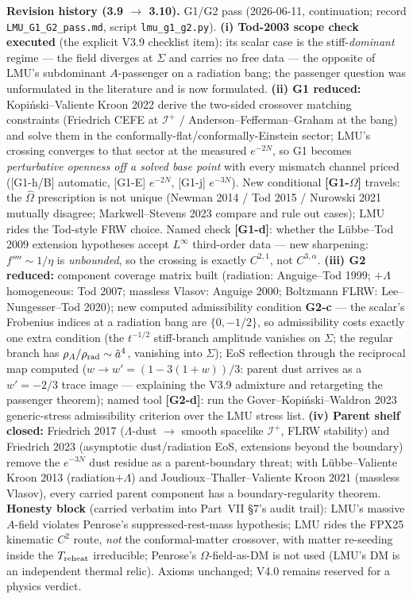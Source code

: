 \documentclass[11pt]{article}
\begin{document}
{\noindent\textbf{Revision history (3.9 $\to$ 3.10).} G1/G2 pass (2026-06-11, continuation; record \texttt{LMU\_G1\_G2\_pass.md}, script \texttt{lmu\_g1\_g2.py}). \textbf{(i) Tod-2003 scope check executed} (the explicit V3.9 checklist item): its scalar case is the stiff-\emph{dominant} regime --- the field diverges at $\Sigma$ and carries no free data --- the opposite of LMU's subdominant $A$-passenger on a radiation bang; the passenger question was unformulated in the literature and is now formulated. \textbf{(ii) G1 reduced:} Kopi\'nski--Valiente Kroon 2022 derive the two-sided crossover matching constraints (Friedrich CEFE at $\mathscr I^+$ / Anderson--Fefferman--Graham at the bang) and solve them in the conformally-flat/conformally-Einstein sector; LMU's crossing converges to that sector at the measured $e^{-2N}$, so G1 becomes \emph{perturbative openness off a solved base point} with every mismatch channel priced ([G1-h/B] automatic, [G1-E] $e^{-2N}$, [G1-j] $e^{-3N}$). New conditional \textbf{[G1-$\Omega$]} travels: the $\hat\Omega$ prescription is not unique (Newman 2014 / Tod 2015 / Nurowski 2021 mutually disagree; Markwell--Stevens 2023 compare and rule out cases); LMU rides the Tod-style FRW choice. Named check \textbf{[G1-d]}: whether the L\"ubbe--Tod 2009 extension hypotheses accept $L^\infty$ third-order data --- new sharpening: $f''''\sim1/\eta$ is \emph{unbounded}, so the crossing is exactly $C^{2,1}$, not $C^{3,\alpha}$. \textbf{(iii) G2 reduced:} component coverage matrix built (radiation: Anguige--Tod 1999; $+\Lambda$ homogeneous: Tod 2007; massless Vlasov: Anguige 2000; Boltzmann FLRW: Lee--Nungesser--Tod 2020); new computed admissibility condition \textbf{G2-c} --- the scalar's Frobenius indices at a radiation bang are $\{0,-1/2\}$, so admissibility costs exactly one extra condition (the $t^{-1/2}$ stiff-branch amplitude vanishes on $\Sigma$; the regular branch has $\rho_A/\rho_{\rm rad}\sim\hat a^4$, vanishing into $\Sigma$); EoS reflection through the reciprocal map computed ($w\to w'=(1-3(1+w))/3$: parent dust arrives as a $w'=-2/3$ trace image --- explaining the V3.9 admixture and retargeting the passenger theorem); named tool \textbf{[G2-d]}: run the Gover--Kopi\'nski--Waldron 2023 generic-stress admissibility criterion over the LMU stress list. \textbf{(iv) Parent shelf closed:} Friedrich 2017 ($\Lambda$-dust $\to$ smooth spacelike $\mathscr I^+$, FLRW stability) and Friedrich 2023 (asymptotic dust/radiation EoS, extensions beyond the boundary) remove the $e^{-3N}$ dust residue as a parent-boundary threat; with L\"ubbe--Valiente Kroon 2013 (radiation$+\Lambda$) and Joudioux--Thaller--Valiente Kroon 2021 (massless Vlasov), every carried parent component has a boundary-regularity theorem. \textbf{Honesty block} (carried verbatim into Part~VII \S7's audit trail): LMU's massive $A$-field violates Penrose's suppressed-rest-mass hypothesis; LMU rides the FPX25 kinematic $C^2$ route, \emph{not} the conformal-matter crossover, with matter re-seeding inside the $T_{\rm reheat}$ irreducible; Penrose's $\Omega$-field-as-DM is not used (LMU's DM is an independent thermal relic). Axioms unchanged; V4.0 remains reserved for a physics verdict.

}
\end{document}
